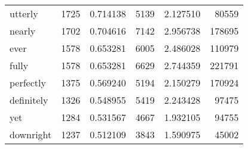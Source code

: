 \begin{table}[ht]
\begin{tabular}{lrrrrr}
utterly & {\cellcolor[HTML]{9DB9D9}} \color[HTML]{000000} 1725 & {\cellcolor[HTML]{9DB9D9}} \color[HTML]{000000} 0.714138 & {\cellcolor[HTML]{AAC4DE}} \color[HTML]{000000} 5139 & {\cellcolor[HTML]{AAC4DE}} \color[HTML]{000000} 2.127510 & {\cellcolor[HTML]{EEF5F9}} \color[HTML]{000000} 80559 \\
nearly & {\cellcolor[HTML]{9EBCDA}} \color[HTML]{000000} 1702 & {\cellcolor[HTML]{9EBCDA}} \color[HTML]{000000} 0.704616 & {\cellcolor[HTML]{91A1CC}} \color[HTML]{F1F1F1} 7142 & {\cellcolor[HTML]{91A1CC}} \color[HTML]{F1F1F1} 2.956738 & {\cellcolor[HTML]{E1EDF5}} \color[HTML]{000000} 178695 \\
ever & {\cellcolor[HTML]{A5C1DC}} \color[HTML]{000000} 1578 & {\cellcolor[HTML]{A5C1DC}} \color[HTML]{000000} 0.653281 & {\cellcolor[HTML]{9CB8D8}} \color[HTML]{000000} 6005 & {\cellcolor[HTML]{9CB8D8}} \color[HTML]{000000} 2.486028 & {\cellcolor[HTML]{EAF3F8}} \color[HTML]{000000} 110979 \\
fully & {\cellcolor[HTML]{A5C1DC}} \color[HTML]{000000} 1578 & {\cellcolor[HTML]{A5C1DC}} \color[HTML]{000000} 0.653281 & {\cellcolor[HTML]{96ABD1}} \color[HTML]{F1F1F1} 6629 & {\cellcolor[HTML]{96ABD1}} \color[HTML]{F1F1F1} 2.744359 & {\cellcolor[HTML]{DBE8F2}} \color[HTML]{000000} 221791 \\
perfectly & {\cellcolor[HTML]{B1C9E1}} \color[HTML]{000000} 1375 & {\cellcolor[HTML]{B1C9E1}} \color[HTML]{000000} 0.569240 & {\cellcolor[HTML]{A9C4DE}} \color[HTML]{000000} 5194 & {\cellcolor[HTML]{A9C4DE}} \color[HTML]{000000} 2.150279 & {\cellcolor[HTML]{E3EEF5}} \color[HTML]{000000} 170924 \\
definitely & {\cellcolor[HTML]{B4CCE2}} \color[HTML]{000000} 1326 & {\cellcolor[HTML]{B4CCE2}} \color[HTML]{000000} 0.548955 & {\cellcolor[HTML]{A6C2DD}} \color[HTML]{000000} 5419 & {\cellcolor[HTML]{A6C2DD}} \color[HTML]{000000} 2.243428 & {\cellcolor[HTML]{EBF4F8}} \color[HTML]{000000} 97475 \\
yet & {\cellcolor[HTML]{B6CDE3}} \color[HTML]{000000} 1284 & {\cellcolor[HTML]{B6CDE3}} \color[HTML]{000000} 0.531567 & {\cellcolor[HTML]{B3CBE2}} \color[HTML]{000000} 4667 & {\cellcolor[HTML]{B3CBE2}} \color[HTML]{000000} 1.932105 & {\cellcolor[HTML]{ECF4F9}} \color[HTML]{000000} 94755 \\
downright & {\cellcolor[HTML]{BACFE4}} \color[HTML]{000000} 1237 & {\cellcolor[HTML]{BACFE4}} \color[HTML]{000000} 0.512109 & {\cellcolor[HTML]{C2D5E7}} \color[HTML]{000000} 3843 & {\cellcolor[HTML]{C2D5E7}} \color[HTML]{000000} 1.590975 & {\cellcolor[HTML]{F2F8FB}} \color[HTML]{000000} 45002 \\

\end{tabular}
\end{table}
